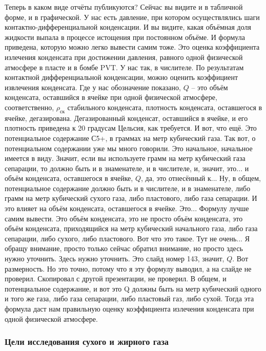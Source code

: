 \documentclass[main.tex]{subfiles}
\begin{document}
Теперь в каком виде отчёты публикуются?
Сейчас вы видите и в табличной форме, и в графической.
У нас есть давление, при котором осуществлялись шаги контактно-дифференциальной конденсации.
И вы видите, какая объёмная доля жидкости выпала в процессе истощения при постоянном объёме.
И формула приведена, которую можно легко вывести самим тоже.
Это оценка коэффициента излечения конденсата при достижении давления, равного одной физической атмосфере в пласте и в бомбе PVT.
У нас так, в числителе.
По результатам контактной дифференциальной конденсации, можно оценить коэффициент извлечения конденсата.
Где у нас обозначение показано, $Q$ -- это объём конденсата, оставшийся в ячейке при одной физической атмосфере, соответственно, $\rho_{\text{ск}}$ стабильного конденсата, плотность конденсата, оставшегося в ячейке, дегазирована.
Дегазированный конденсат, оставшийся в ячейке, и его плотность приведена к 20 градусам Цельсия, как требуется.
И вот, что ещё.
Это потенциальное содержание С5+, в граммах на метр кубический газа.
Так вот, о потенциальном содержании уже мы много говорили.
Это начальное, начальное имеется в виду.
Значит, если вы используете грамм на метр кубический газа сепарации, то должно быть и в знаменателе, и в числителе, и, значит, это... и объём конденсата, оставшегося в ячейке, $Q$, да, это отнесённый к...
Ну, в общем, потенциальное содержание должно быть и в числителе, и в знаменателе, либо грамм на метр кубический сухого газа, либо пластового, либо газа сепарации.
И это влияет на объём конденсата, оставшегося в ячейке.
Это...
Формулу лучше самим вывести.
Это объём конденсата, это не просто объём конденсата, это объём конденсата, приходящийся на метр кубический начального газа, либо газа сепарации, либо сухого, либо пластового.
Вот что это такое.
Тут не очень...
Я обращу внимание, просто только сейчас обратил внимание, но просто здесь нужно уточнить.
Здесь нужно уточнить.
Это слайд номер 143, значит, $Q$.
Вот размерность.
Но это точно, потому что я эту формулу выводил, а на слайде не проверил.
Скопировал с другой презентации, не проверил.
В общем, и потенциальное содержание, и вот это Q должны быть на метр кубический одного и того же газа, либо газа сепарации, либо пластовый газ, либо сухой.
Тогда эта формула даст нам правильную оценку коэффициента излечения конденсата при одной физической атмосфере.

\subsubsection{Цели исследования сухого и жирного газа}
\end{document}
